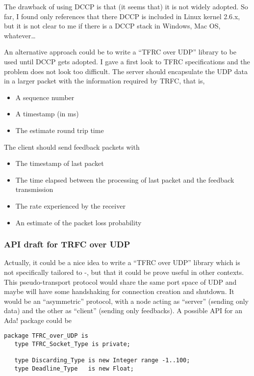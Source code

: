 \documentclass{medusabook}
\begin{document}
\begin{subappendices}
The drawback of using DCCP is that (it seems that) it is not widely
adopted.  So far, I found only references that there DCCP is included
in Linux kernel 2.6.x, but it is not clear to me if there is a DCCP
stack in Windows, Mac OS, whatever\ldots

An alternative approach could be to write a ``TFRC over UDP'' library
to be used until DCCP gets adopted.  I gave a first look to TFRC
specifications \cite{rfc3448} and the problem does not look too
difficult.  The server should encapsulate the UDP data in a larger
packet with the information required by TRFC, that is,
\begin{itemize}
  \item A sequence number 
  \item A timestamp (in ms)
  \item The estimate round trip time
\end{itemize}
%
The client should send feedback packets with
\begin{itemize}
  \item The timestamp of last packet
  \item The time elapsed between the processing of last packet and the
  feedback  transmission
  \item The rate experienced by the receiver
  \item An estimate of the packet loss probability
\end{itemize}

\subsubsection{API draft for TRFC over UDP}
\label{subsub:sec:rate-control.0;medusa_book}

Actually, it could be a nice idea to write a ``TFRC over UDP'' library
which is not specifically tailored to \medusa-, but that it could be
prove useful in other contexts.  This pseudo-transport protocol would
share the same port space of UDP and maybe will have some handshaking
for connection creation and shutdown.  It would be an ``asymmetric''
protocol, with a node acting as ``server'' (sending only data) and
the other as ``client'' (sending only feedbacks).  A possible API
for an \ttt Ada! package could be

\begin{verbatim}
package TFRC_over_UDP is
   type TFRC_Socket_Type is private;

   type Discarding_Type is new Integer range -1..100;
   type Deadline_Type   is new Float;


\end{verbatim}
\end{subappendices}
\end{document}
